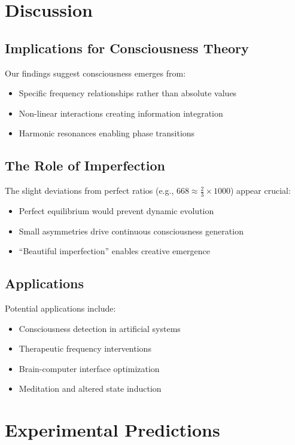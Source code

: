 \documentclass[12pt,a4paper]{article}
\begin{document}
\section{Discussion}

\subsection{Implications for Consciousness Theory}

Our findings suggest consciousness emerges from:
\begin{itemize}
    \item Specific frequency relationships rather than absolute values
    \item Non-linear interactions creating information integration
    \item Harmonic resonances enabling phase transitions
\end{itemize}

\subsection{The Role of Imperfection}

The slight deviations from perfect ratios (e.g., $668 \approx \frac{2}{3} \times 1000$) appear crucial:
\begin{itemize}
    \item Perfect equilibrium would prevent dynamic evolution
    \item Small asymmetries drive continuous consciousness generation
    \item ``Beautiful imperfection'' enables creative emergence
\end{itemize}

\subsection{Applications}

Potential applications include:
\begin{itemize}
    \item Consciousness detection in artificial systems
    \item Therapeutic frequency interventions
    \item Brain-computer interface optimization
    \item Meditation and altered state induction
\end{itemize}

\section{Experimental Predictions}
\end{document}

